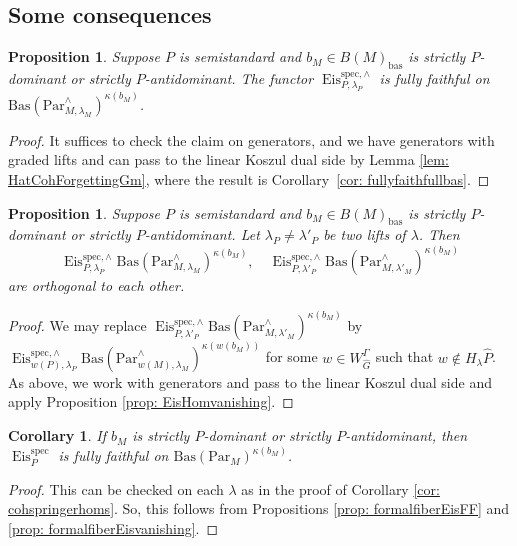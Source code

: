 \documentclass{amsart}
\newtheorem{proposition}[theorem]{Proposition}
\newtheorem{corollary}[theorem]{Corollary}
\theoremstyle{definition}
\theoremstyle{remark}
\numberwithin{equation}{section}
\newcommand{\bas}{\mathrm{bas}}
\newcommand{\spec}{\mathrm{spec}}
\newcommand{\wh}{\widehat}
\newcommand{\Par}{\mathrm{Par}}
\DeclareMathOperator{\Eis}{\mathrm{Eis}}
\newcommand{\Bas}{\mathrm{Bas}}
\begin{document}
\subsection{Some consequences}

\begin{proposition}{\label{prop: formalfiberEisFF}}
Suppose $P$ is semistandard and $b_M\in B(M)_\bas$ is strictly $P$-dominant or strictly $P$-antidominant.  
The functor $\Eis^{\spec,\wedge}_{P,\lambda_P}$ is fully faithful on $\Bas(\Par^{\wedge}_{M, \lambda_M})^{\kappa(b_M)}$.
\end{proposition}

\begin{proof}
It suffices to check the claim on generators, and we have generators with graded lifts and can pass to the linear Koszul dual side by Lemma \ref{lem: HatCohForgettingGm}, where the result is Corollary~\ref{cor: fullyfaithfullbas}.
\end{proof}

\begin{proposition}{\label{prop: formalfiberEisvanishing}}
Suppose $P$ is semistandard and $b_M\in B(M)_\bas$ is strictly $P$-dominant or strictly $P$-antidominant. Let $\lambda_P\neq \lambda'_P$ be two lifts of $\lambda$. 
Then
\[
\Eis^{\spec,\wedge}_{P,\lambda_P}\Bas(\Par^{\wedge}_{M,\lambda_M})^{\kappa(b_M)}, \quad
\Eis^{\spec,\wedge}_{P,\lambda'_P}\Bas(\Par^{\wedge}_{M,\lambda'_M})^{\kappa(b_M)}
\]
are orthogonal to each other. 
\end{proposition}

\begin{proof}
We may replace $\Eis^{\spec,\wedge}_{P,\lambda'_P}\Bas(\Par^{\wedge}_{M, \lambda'_M})^{\kappa(b_M)}$ by $\Eis^{\spec,\wedge}_{w(P),\lambda_P}\Bas(\Par^{\wedge}_{w(M),\lambda_M})^{\kappa(w(b_M))}$ for some $w\in W_{\wh G}^\Gamma$ such that $w\not\in H_\lambda \wh P$. As above, we work with generators and pass to the linear Koszul dual side and apply Proposition \ref{prop: EisHomvanishing}. 
\end{proof}

\begin{corollary}{\label{cor: EisFFonBas}}
If $b_M$ is strictly $P$-dominant or strictly $P$-antidominant, then $\Eis^\spec_P$ is fully faithful on $\Bas (\Par_M)^{\kappa (b_M)}$. 
\end{corollary}

\begin{proof}
This can be checked on each $\lambda$ as in the proof of Corollary \ref{cor: cohspringerhoms}. So, this follows from Propositions \ref{prop: formalfiberEisFF} and \ref{prop: formalfiberEisvanishing}. 
\end{proof}
\end{document}
